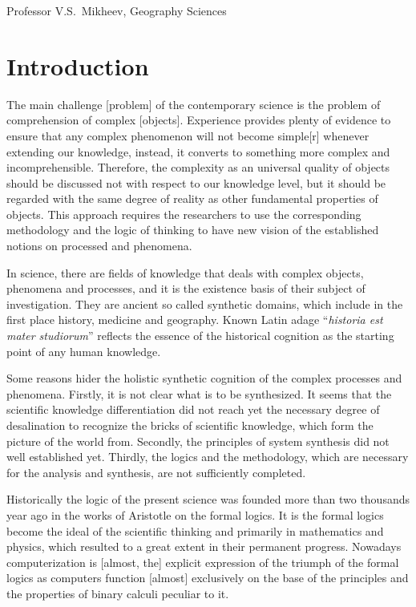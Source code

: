 \documentclass[12pt,leqno]{book}
\numberwithin{equation}{chapter}
\begin{document}
\vspace{1em}
\noindent{} \hfill{} Professor V.S.~Mikheev, Geography Sciences

\chapter*{Introduction}\normalsize

The main challenge [problem] of the contemporary science is the problem of comprehension of complex [objects]. Experience provides plenty of evidence to ensure that any complex phenomenon will not become simple[r] whenever extending our knowledge, instead, it converts to something more complex and incomprehensible. Therefore, the complexity as an universal quality of objects should be discussed not with respect to our knowledge level, but it should be regarded with the same degree of reality as other fundamental properties of objects. This approach requires the researchers to use the corresponding methodology and the logic of thinking to have new vision of the established notions on processed and phenomena.

In science, there are fields of knowledge that deals with complex objects, phenomena and processes, and it is the existence basis of their subject of investigation. They are ancient so called synthetic domains, which include in the first place history, medicine and geography. Known Latin adage ``\emph{historia est mater studiorum}'' reflects the essence of the historical cognition as the starting point of any human knowledge.

Some reasons hider the holistic synthetic cognition of the complex processes and phenomena. Firstly, it is not clear what is to be synthesized. It seems that the scientific knowledge differentiation did not reach yet the necessary degree of desalination to recognize the bricks of scientific knowledge, which form the picture of the world from. Secondly, the principles of system synthesis did not well established yet. Thirdly, the logics and the methodology, which are necessary for the analysis and synthesis, are not sufficiently completed.

Historically the logic of the present science was founded more than two thousands year ago in the works of Aristotle on the formal logics. It is the formal logics become the ideal of the scientific thinking and primarily in mathematics and physics, which resulted to a great extent in their permanent progress. Nowadays computerization is [almost, the] explicit expression of the triumph of the formal logics as computers function [almost] exclusively on the base of the principles and the properties of binary calculi peculiar to it.
\end{document}
